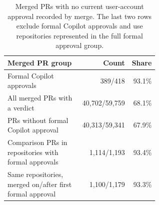 \begin{table}[H]
\centering
\caption{Merged PRs with no current user-account approval recorded by merge. The last two rows exclude formal Copilot approvals and use repositories represented in the full formal approval group.}
\label{tab:approval-context}
\small
\begin{tabular}{@{}p{0.60\linewidth}rr@{}}
\toprule
Merged PR group & Count & Share \\
\midrule
Formal Copilot approvals & 389/418 & 93.1\% \\
All merged PRs with a verdict & 40,702/59,759 & 68.1\% \\
PRs without formal Copilot approval & 40,313/59,341 & 67.9\% \\
Comparison PRs in repositories with formal approvals & 1,114/1,193 & 93.4\% \\
Same repositories, merged on/after first formal approval & 1,100/1,179 & 93.3\% \\
\bottomrule
\end{tabular}
\end{table}
